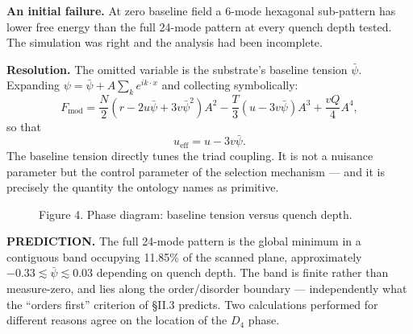 \documentclass[11pt,a4paper]{article}
\begin{document}
\textbf{An initial failure.} At zero baseline field a 6-mode hexagonal sub-pattern has lower free energy than the full 24-mode pattern at every quench depth tested. The simulation was right and the analysis had been incomplete.

\textbf{Resolution.} The omitted variable is the substrate's baseline tension $\bar{\psi}$. Expanding $\psi = \bar{\psi} + A\sum_k e^{ik\cdot x}$ and collecting symbolically:
\begin{equation}
F_{\mathrm{mod}} = \frac{N}{2}(r - 2u\bar{\psi} + 3v\bar{\psi}^2)A^2 - \frac{T}{3}(u - 3v\bar{\psi})A^3 + \frac{vQ}{4}A^4,
\end{equation}
so that
\begin{equation}
u_{\mathrm{eff}} = u - 3v\bar{\psi}.
\end{equation}
The baseline tension directly tunes the triad coupling. It is not a nuisance parameter but the control parameter of the selection mechanism --- and it is precisely the quantity the ontology names as primitive.

\begin{figure}[h]
\centering
{}
\caption{Figure 4. Phase diagram: baseline tension versus quench depth.}
\end{figure}

\textbf{PREDICTION.} The full 24-mode pattern is the global minimum in a contiguous band occupying 11.85\% of the scanned plane, approximately $-0.33 \lesssim \bar{\psi} \lesssim 0.03$ depending on quench depth. The band is finite rather than measure-zero, and lies along the order/disorder boundary --- independently what the ``orders first'' criterion of \S II.3 predicts. Two calculations performed for different reasons agree on the location of the $D_4$ phase.
\end{document}
